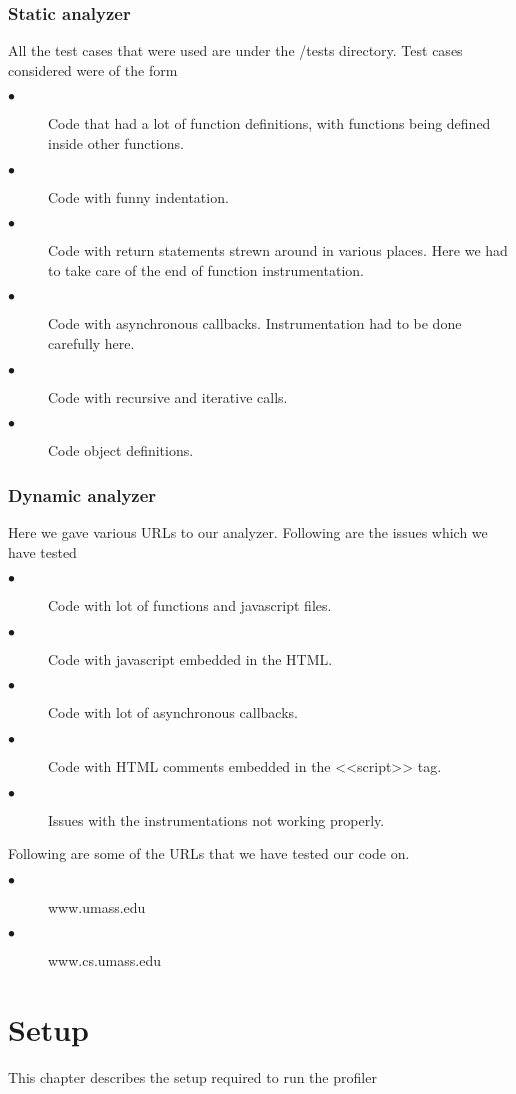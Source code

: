 \documentclass[a4paper, 12pt, notitlepage]{report}
\begin{document}
\subsection{Static analyzer}
All the test cases that were used are under the /tests directory. Test cases considered were of the form
\begin{description}
\item[$\bullet$] Code that had a lot of function definitions, with functions being defined inside other functions.
\item[$\bullet$] Code with funny indentation.
\item[$\bullet$] Code with return statements strewn around in various places. Here we had to take care of the end of function instrumentation.
\item[$\bullet$] Code with asynchronous callbacks. Instrumentation had to be done carefully here.
\item[$\bullet$] Code with recursive and iterative calls.
\item[$\bullet$] Code object definitions.
\end{description}

\subsection{Dynamic analyzer}
Here we gave various URLs to our analyzer. Following are the issues which we have tested
\begin{description}
\item[$\bullet$] Code with lot of functions and javascript files.
\item[$\bullet$] Code with javascript embedded in the HTML.
\item[$\bullet$] Code with lot of asynchronous callbacks.
\item[$\bullet$] Code with HTML comments embedded in the <<script>> tag.
\item[$\bullet$] Issues with the instrumentations not working properly.
\end{description}

Following are some of the URLs that we have tested our code on.
\begin{description}
\item[$\bullet$]www.umass.edu
\item[$\bullet$]www.cs.umass.edu
\end{description}
\chapter{Setup}
%
This chapter describes the setup required to run the profiler
\end{document}
